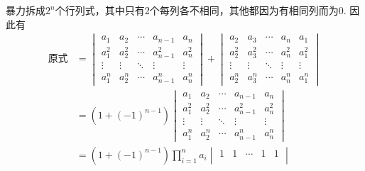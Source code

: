 \documentclass[12pt,fontset=fandol]{ctexart}
\begin{document}
\begin{solve}
暴力拆成$2^n$个行列式，其中只有2个每列各不相同，其他都因为有相同列而为0. 因此有
            \begin{align*}
                \text{原式} & =\begin{vmatrix}
                                    a_{1}     & a_{2}     & \cdots & a_{n-1}     & a_{n}     \\
                                    a_{1}^{2} & a_{2}^{2} & \cdots & a_{n-1}^{2} & a_{n}^{2} \\
                                    \vdots    & \vdots    & \ddots & \vdots      & \vdots    \\
                                    a_{1}^{n} & a_{2}^{n} & \cdots & a_{n-1}^{n} & a_{n}^{n}
                                \end{vmatrix}+
                \begin{vmatrix}
                    a_{2}     & a_{3}     & \cdots & a_{n}     & a_{1}     \\
                    a_{2}^{2} & a_{3}^{2} & \cdots & a_{n}^{2} & a_{1}^{2} \\
                    \vdots    & \vdots    & \ddots & \vdots    & \vdots    \\
                    a_{2}^{n} & a_{3}^{n} & \cdots & a_{n}^{n} & a_{1}^{n}
                \end{vmatrix}                                               \\
                            & =(1+(-1)^{n-1})\begin{vmatrix}
                                                a_{1}     & a_{2}     & \cdots & a_{n-1}     & a_{n}     \\
                                                a_{1}^{2} & a_{2}^{2} & \cdots & a_{n-1}^{2} & a_{n}^{2} \\
                                                \vdots    & \vdots    & \ddots & \vdots      & \vdots    \\
                                                a_{1}^{n} & a_{2}^{n} & \cdots & a_{n-1}^{n} & a_{n}^{n}
                                            \end{vmatrix}                \\
                            & =(1+(-1)^{n-1})\prod_{i=1}^na_i
                \begin{vmatrix}
                    1           & 1           & \cdots & 1             & 1           \\

\end{vmatrix}
\end{align*}
\end{solve}
\end{document}
